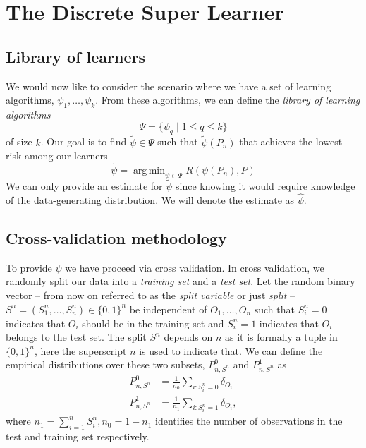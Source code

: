 \documentclass[11pt, a4paper]{article}
\DeclareMathOperator*{\argmin}{arg\,min}
\theoremstyle{definition}
\theoremstyle{remark}
\newcommand{\q}{q}
\newcommand{\ml}{k}
\newcommand{\btheta}{\theta}
\newcommand{\la}{\psi}
\newcommand{\Sn}{S^n}
\newcommand{\lib}{\Psi}
\begin{document}


\section{The Discrete Super Learner}
\subsection{Library of learners}
We would now like to consider the scenario where we have a set of learning algorithms, $ \la_1, \ldots, \la_\ml $. From these algorithms, we can define the \textit{library of learning algorithms} 
$$ \lib = \{\la_{\q} \mid 1 \leq \q \leq \ml \} $$
of size $ \ml $. Our goal is to find $ \tilde{\la} \in \lib $ such that $ \tilde{\la}(P_n) $ that achieves the lowest risk among our learners 
$$ \tilde{\la}  = \argmin_{\la \in \lib} R(\la(P_n) , P) $$
We can only provide an estimate for $ \tilde{\la} $ since knowing it would require knowledge of the data-generating distribution. We will denote the estimate as $ \hat{\la} $. 

\subsection{Cross-validation methodology}
To provide $ \hat{\la} $ we have proceed via cross validation. In cross validation, we randomly split our data into a \textit{training set} and a \textit{test set}. Let the random binary vector -- from now on referred to as the \textit{split variable} or just \textit{split} -- $ \Sn = (\Sn_1,\ldots,\Sn_n) \in \{0,1\}^{n} $ be independent of $ O_1,\ldots, O_n $ such that $ \Sn_i = 0 $ indicates that $ O_i $ should be in the training set and $ \Sn_i = 1 $ indicates that $ O_i $ belongs to the test set. The split $ \Sn $ depends on $ n $ as it is formally a tuple in $ \{0,1\}^{n} $, here the superscript $ n $ is used to indicate that. We can define the empirical distributions over these two subsets, $ P_{n,\Sn}^0$ and $ P_{n,\Sn}^{1} $ as
\begin{align*}
    P_{n,\Sn}^{0} &= \frac{1}{n_0} \sum_{i: \Sn_i = 0} \delta_{O_i} \\
    P_{n,\Sn}^{1} &= \frac{1}{n_1} \sum_{i: \Sn_i = 1} \delta_{O_i},
\end{align*}
where $ n_1 = \sum_{i = 1}^{n} \Sn_i, n_0 = 1-n_1$ identifies the number of observations in the test and training set respectively.
\end{document}
